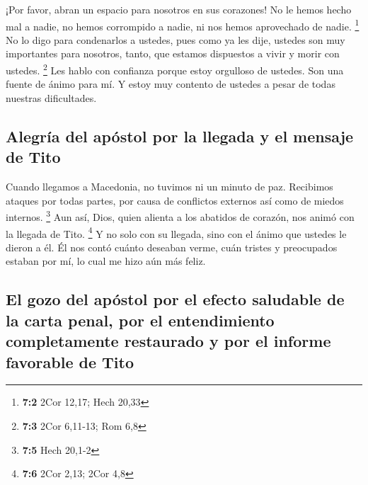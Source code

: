  ¡Por favor, abran un espacio para nosotros en sus
corazones! No le hemos hecho mal a nadie, no hemos corrompido a nadie,
ni nos hemos aprovechado de nadie. \footnote{\textbf{7:2} 2Cor 12,17;
  Hech 20,33}  No lo digo para condenarlos a ustedes, pues
como ya les dije, ustedes son muy importantes para nosotros, tanto, que
estamos dispuestos a vivir y morir con ustedes. \footnote{\textbf{7:3}
  2Cor 6,11-13; Rom 6,8}  Les hablo con confianza porque
estoy orgulloso de ustedes. Son una fuente de ánimo para mí. Y estoy muy
contento de ustedes a pesar de todas nuestras dificultades.

\hypertarget{alegruxeda-del-apuxf3stol-por-la-llegada-y-el-mensaje-de-tito}{%
\subsection{Alegría del apóstol por la llegada y el mensaje de
Tito}\label{alegruxeda-del-apuxf3stol-por-la-llegada-y-el-mensaje-de-tito}}

 Cuando llegamos a Macedonia, no tuvimos ni un minuto de
paz. Recibimos ataques por todas partes, por causa de conflictos
externos así como de miedos internos. \footnote{\textbf{7:5} Hech 20,1-2}
 Aun así, Dios, quien alienta a los abatidos de corazón,
nos animó con la llegada de Tito. \footnote{\textbf{7:6} 2Cor 2,13; 2Cor
  4,8}  Y no solo con su llegada, sino con el ánimo que
ustedes le dieron a él. Él nos contó cuánto deseaban verme, cuán tristes
y preocupados estaban por mí, lo cual me hizo aún más feliz.

\hypertarget{el-gozo-del-apuxf3stol-por-el-efecto-saludable-de-la-carta-penal-por-el-entendimiento-completamente-restaurado-y-por-el-informe-favorable-de-tito}{%
\subsection{El gozo del apóstol por el efecto saludable de la carta
penal, por el entendimiento completamente restaurado y por el informe
favorable de
Tito}\label{el-gozo-del-apuxf3stol-por-el-efecto-saludable-de-la-carta-penal-por-el-entendimiento-completamente-restaurado-y-por-el-informe-favorable-de-tito}}

